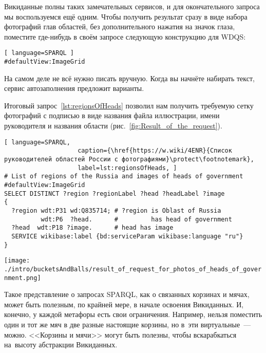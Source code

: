 Викиданные полны таких замечательных сервисов, и для окончательного запроса мы воспользуемся ещё одним. 
Чтобы получить результат сразу в виде набора фотографий глав областей, 
без дополнительного нажатия на значок глаза, поместите где-нибудь в своём запросе следующую конструкцию для WDQS:
\begin{lstlisting}[ language=SPARQL ]
#defaultView:ImageGrid
\end{lstlisting}

На самом деле не всё нужно писать вручную. Когда вы начнёте набирать текст, сервис автозаполнения предложит варианты.


\newpage
Итоговый запрос~\ref{lst:regionsOfHeads} позволил нам получить требуемую сетку фотографий 
с подписью в виде названия файла иллюстрации, имени руководителя и названия области (рис.~\ref{fig:Result_of_the_request}).

\lstset{numbers=left, firstnumber=1, frame=single}
\begin{lstlisting}[ language=SPARQL, 
                    caption={\href{https://w.wiki/4ENR}{Список руководителей областей России с фотографиями}\protect\footnotemark}, 
                    label=lst:regionsOfHeads, ]
# List of regions of the Russia and images of heads of government
#defaultView:ImageGrid
SELECT DISTINCT ?region ?regionLabel ?head ?headLabel ?image
{
  ?region wdt:P31 wd:Q835714; # ?region is Oblast of Russia
          wdt:P6  ?head.      #         has head of government
  ?head  wdt:P18 ?image.      # head has image
  SERVICE wikibase:label {bd:serviceParam wikibase:language "ru"} 
}
\end{lstlisting}

\begin{figure*}[h!]
\texttt{[image: ./intro/bucketsAndBalls/result\_of\_request\_for\_photos\_of\_heads\_of\_government.png]}
    \caption[Сетка фотографий руководителей областей.]{Руководители областей: их имена и фотографии, названия областей. Результат запроса~\protect\ref{lst:regionsOfHeads} в виде сетки изображений}
    \label{fig:Result_of_the_request}
\end{figure*}

Такое представление о запросах SPARQL, как о связанных корзинах и мячах, может быть полезным, 
по крайней мере, в начале освоения Викиданных. 
И, конечно, у каждой метафоры есть свои ограничения. 
Например, нельзя поместить один и тот же мяч в две разные настоящие корзины, 
но в~эти виртуальные~--- можно. 
<<Корзины и мячи>> могут быть полезны, чтобы вскарабкаться на~высоту абстракции Викиданных.

